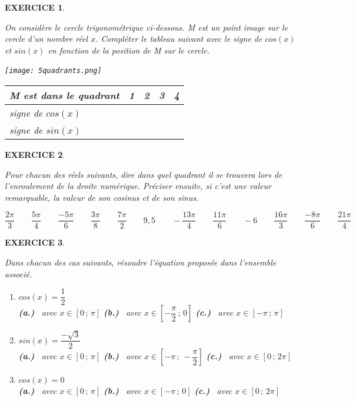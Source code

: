 \documentclass[a4paper]{article}   %
\renewcommand{\(}{\left(}
\renewcommand{\)}{\right)}
\newtheorem{EXO}{\large EXERCICE }
\newenvironment{EX}   { \setcounter{ques}{0} \begin{EXO} \hrulefill ~\vspace{0.3cm}

\normalfont}    {\end{EXO} \medskip}
\newcommand{\f}{\dfrac} 	%
\begin{document}
\begin{EX} On considère le cercle trigonométrique ci-dessous. M est un point image sur le cercle d'un nombre réel $x$. Compléter le tableau suivant avec le signe de $cos(x)$ et $sin(x)$ en fonction de la position de M sur le cercle.


\begin{center}
\texttt{[image: 5quadrants.png]}
~~ \\
\begin{tabular}{|p{4cm}| p{1cm}| p{1cm}| p{1cm}| p{1cm}|}		
\hline							
M est dans le quadrant &1 & 2 & 3& 4\\
\hline
signe de $cos(x)$ & & & &\\
\hline
signe de $sin(x)$ & & & &\\
\hline
\end{tabular}
\end{center}


\end{EX}

\begin{EX}
Pour chacun des réels suivants, dire dans quel quadrant il se trouvera lors de l'enroulement de la droite numérique. Préciser ensuite, si c'est une valeur remarquable, la valeur de son cosinus et de son sinus. 

$$\f{2\pi}{3} \qquad \f{5\pi}{4} \qquad \f{-5\pi}{6} \qquad \f{3\pi}{8} \qquad \f{7\pi}{2} \qquad 9,5 \qquad -\f{13\pi}{4} \qquad \f{11\pi}{6} \qquad -6 \qquad \f{16\pi}{3} \qquad \f{-8\pi}{6} \qquad \f{21\pi}{4}$$

\end{EX}



\begin{EX} Dans chacun des cas suivants, résoudre l'équation proposée dans l'ensemble associé.
\begin{enumerate}
\item $cos(x)=\f{1}{2}$ \\
\textbf{(a.)} \, avec $x \in [0\,;\, \pi]$
\hspace{1.5cm}\textbf{ (b.)} \, avec $x \in [-\f{\pi}{2}\,;\,0]$
\hspace{1.5cm} \textbf{(c.) }\, avec $x \in [-\pi\,;\, \pi]$

\item $sin(x)=\f{-\sqrt3}{2}$ \\
\textbf{(a.)} \, avec $x \in [0\,;\, \pi]$
\hspace{1.5cm}\textbf{ (b.)} \, avec $x \in [-\pi\,;\,-\f{\pi}{2}]$
\hspace{1.5cm} \textbf{(c.) }\, avec $x \in [0\,;\, 2\pi]$

\item $cos(x)=0$ \\
\textbf{(a.)} \, avec $x \in [0\,;\, \pi]$
\hspace{1.5cm}\textbf{ (b.)} \, avec $x \in [-\pi\,;\,0]$
\hspace{1.5cm} \textbf{(c.) }\, avec $x \in [0\,;\, 2\pi]$
\end{enumerate}

\end{EX}
\end{document}
